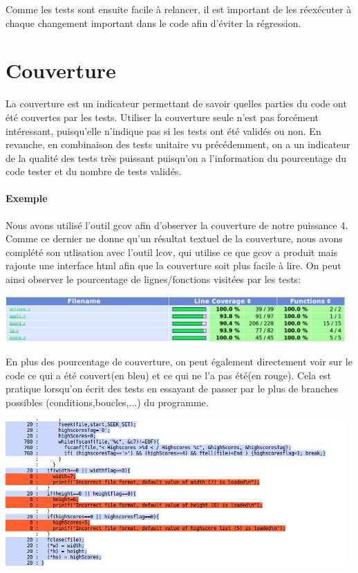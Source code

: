\documentclass{report}
\begin{document}
Comme les tests sont ensuite facile à relancer, il est important de les réexécuter à chaque changement important dans le code afin d'éviter la régression.

\section{Couverture}
La couverture est un indicateur permettant de savoir quelles parties du code ont été couvertes par les tests. Utiliser la couverture seule n'est pas forcément intéressant, puisqu'elle n'indique pas si les tests ont été validés ou non. En revanche, en combinaison des tests unitaire vu précédemment, on a un indicateur de la qualité des tests très puissant puisqu'on a l'information du pourcentage du code tester et du nombre de tests validés.
\paragraph{Exemple}
Nous avons utilisé l'outil gcov afin d'observer la couverture de notre puissance 4. Comme ce dernier ne donne qu'un résultat textuel de la couverture, nous avons complété son utlisation avec l'outil lcov, qui utilise ce que gcov a produit mais rajoute une interface html afin que la couverture soit plus facile à lire. On peut ainsi observer le pourcentage de lignes/fonctions visitées par les tests:

\begin{center}
  \includegraphics[width=13cm]{couverture1.png}
\end{center}

En plus des pourcentage de couverture, on peut également directement voir sur le code ce qui a été couvert(en bleu) et ce qui ne l'a pas été(en rouge). Cela est pratique lorsqu'on écrit des tests en essayant de passer par le plus de branches possibles (conditions,boucles,...) du programme.

\begin{center}
  \includegraphics[width=13cm]{couverture2.png}
\end{center}
\end{document}
